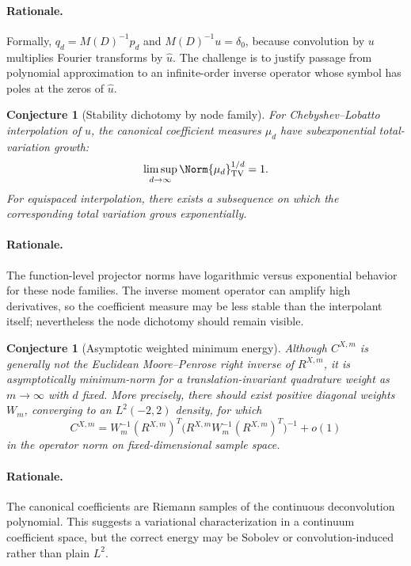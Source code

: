 \documentclass[11pt,oneside]{book}
\newtheorem{conjecture}[theorem]{Conjecture}
\theoremstyle{definition}
\theoremstyle{remark}
\begin{document}
\paragraph{Rationale.}
Formally, \(q_d=M(D)^{-1}p_d\) and \(M(D)^{-1}u=\delta_0\), because convolution by \(u\) multiplies Fourier transforms by \(\widehat u\).  The challenge is to justify passage from polynomial approximation to an infinite-order inverse operator whose symbol has poles at the zeros of \(\widehat u\).

\begin{conjecture}[Stability dichotomy by node family]
\label{conj:stability-dichotomy}
For Chebyshev--Lobatto interpolation of \(u\), the canonical coefficient measures \(\mu_d\) have subexponential total-variation growth:
\begin{equation}
 \limsup_{d\to\infty}\Norm{\mu_d}_{\mathrm{TV}}^{1/d}=1.
 \label{eq:subexponential-tv}
\end{equation}
For equispaced interpolation, there exists a subsequence on which the corresponding total variation grows exponentially.
\end{conjecture}

\paragraph{Rationale.}
The function-level projector norms have logarithmic versus exponential behavior for these node families.  The inverse moment operator can amplify high derivatives, so the coefficient measure may be less stable than the interpolant itself; nevertheless the node dichotomy should remain visible.

\begin{conjecture}[Asymptotic weighted minimum energy]
\label{conj:min-energy}
Although \(C^{X,m}\) is generally not the Euclidean Moore--Penrose right inverse of \(R^{X,m}\), it is asymptotically minimum-norm for a translation-invariant quadrature weight as \(m\to\infty\) with \(d\) fixed.  More precisely, there should exist positive diagonal weights \(W_m\), converging to an \(L^2(-2,2)\) density, for which
\begin{equation}
 C^{X,m}=W_m^{-1}(R^{X,m})^T
 \bigl(R^{X,m}W_m^{-1}(R^{X,m})^T\bigr)^{-1}+o(1)
 \label{eq:weighted-pseudoinverse}
\end{equation}
in the operator norm on fixed-dimensional sample space.
\end{conjecture}

\paragraph{Rationale.}
The canonical coefficients are Riemann samples of the continuous deconvolution polynomial.  This suggests a variational characterization in a continuum coefficient space, but the correct energy may be Sobolev or convolution-induced rather than plain \(L^2\).
\end{document}
